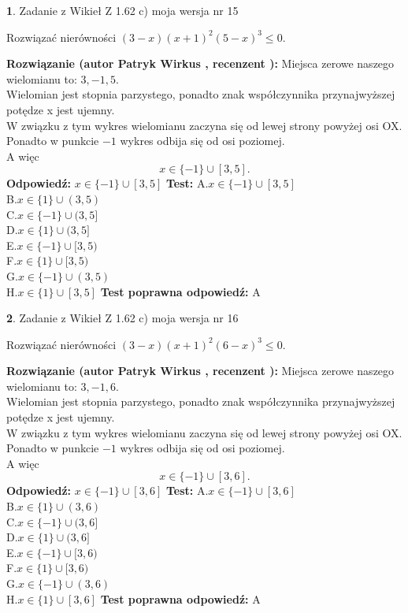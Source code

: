 \documentclass[12pt, a4paper]{article}
\theoremstyle{definition} %
\newtheorem{zad}{}
\newcommand{\zadStart}[1]{\begin{zad}#1\newline}
\newcommand{\zadStop}{\end{zad}}
\newcommand{\rozwStart}[2]{\noindent \textbf{Rozwiązanie (autor #1 , recenzent #2): }\newline}
\newcommand{\rozwStop}{\newline}
\newcommand{\odpStart}{\noindent \textbf{Odpowiedź:}\newline}
\newcommand{\odpStop}{\newline}
\newcommand{\testStart}{\noindent \textbf{Test:}\newline}
\newcommand{\testStop}{\newline}
\newcommand{\kluczStart}{\noindent \textbf{Test poprawna odpowiedź:}\newline}
\newcommand{\kluczStop}{\newline}
\begin{document}
\zadStart{Zadanie z Wikieł Z 1.62 c) moja wersja nr 15}

Rozwiązać nierówności $(3-x)(x+1)^{2}(5-x)^{3}\le0$.
\zadStop
\rozwStart{Patryk Wirkus}{}
Miejsca zerowe naszego wielomianu to: $3, -1, 5$.\\
Wielomian jest stopnia parzystego, ponadto znak współczynnika przy\linebreak najwyższej potędze x jest ujemny.\\ W związku z tym wykres wielomianu zaczyna się od lewej strony powyżej osi OX.\\
Ponadto w punkcie $-1$ wykres odbija się od osi poziomej.\\
A więc $$x \in \{-1\} \cup [3,5].$$
\rozwStop
\odpStart
$x \in \{-1\} \cup [3,5]$
\odpStop
\testStart
A.$x \in \{-1\} \cup [3,5]$\\
B.$x \in \{1\} \cup (3,5)$\\
C.$x \in \{-1\} \cup (3,5]$\\
D.$x \in \{1\} \cup (3,5]$\\
E.$x \in \{-1\} \cup [3,5)$\\
F.$x \in \{1\} \cup [3,5)$\\
G.$x \in \{-1\} \cup (3,5)$\\
H.$x \in \{1\} \cup [3,5]$
\testStop
\kluczStart
A
\kluczStop



\zadStart{Zadanie z Wikieł Z 1.62 c) moja wersja nr 16}

Rozwiązać nierówności $(3-x)(x+1)^{2}(6-x)^{3}\le0$.
\zadStop
\rozwStart{Patryk Wirkus}{}
Miejsca zerowe naszego wielomianu to: $3, -1, 6$.\\
Wielomian jest stopnia parzystego, ponadto znak współczynnika przy\linebreak najwyższej potędze x jest ujemny.\\ W związku z tym wykres wielomianu zaczyna się od lewej strony powyżej osi OX.\\
Ponadto w punkcie $-1$ wykres odbija się od osi poziomej.\\
A więc $$x \in \{-1\} \cup [3,6].$$
\rozwStop
\odpStart
$x \in \{-1\} \cup [3,6]$
\odpStop
\testStart
A.$x \in \{-1\} \cup [3,6]$\\
B.$x \in \{1\} \cup (3,6)$\\
C.$x \in \{-1\} \cup (3,6]$\\
D.$x \in \{1\} \cup (3,6]$\\
E.$x \in \{-1\} \cup [3,6)$\\
F.$x \in \{1\} \cup [3,6)$\\
G.$x \in \{-1\} \cup (3,6)$\\
H.$x \in \{1\} \cup [3,6]$
\testStop
\kluczStart
A
\kluczStop
\end{document}
